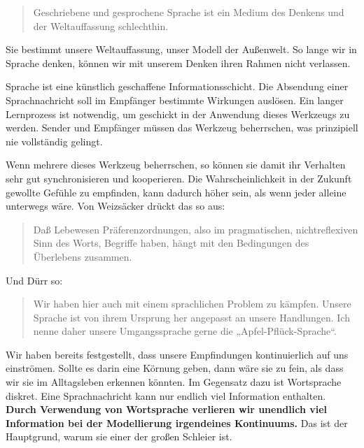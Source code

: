 \documentclass[12pt]{book}
\begin{document}
\begin{quote}\begin{tcolorbox}
Geschriebene und gesprochene Sprache ist ein Medium des Denkens und der Weltauffassung schlechthin.
\end{tcolorbox}\end{quote}

Sie bestimmt unsere Weltauffassung, unser Modell der Außenwelt. So lange wir in Sprache denken, können wir mit unserem Denken ihren Rahmen nicht verlassen. 

Sprache ist eine künstlich geschaffene Informationsschicht. Die Absendung einer Sprachnachricht soll im Empfänger bestimmte Wirkungen auslösen. Ein langer Lernprozess ist notwendig, um geschickt in der Anwendung dieses Werkzeugs zu werden. Sender und Empfänger müssen das Werkzeug beherrschen, was prinzipiell nie vollständig gelingt.

Wenn mehrere dieses Werkzeug beherrschen, so können sie damit ihr Verhalten sehr gut synchronisieren und kooperieren. Die Wahrscheinlichkeit in der Zukunft gewollte Gefühle zu empfinden, kann dadurch höher sein, als wenn jeder alleine unterwegs wäre. Von Weizsäcker drückt das so aus:

\begin{quote}\begin{tcolorbox}
Daß Lebewesen Präferenzordnungen, also im pragmatischen, nichtreflexiven Sinn des Worts, Begriffe haben, hängt mit den Bedingungen des Überlebens zusammen.
\end{tcolorbox}\end{quote}

Und Dürr so:
\begin{quote}\begin{tcolorbox}
Wir haben hier auch mit einem sprachlichen Problem zu kämpfen. Unsere Sprache ist von ihrem Ursprung her angepasst an unsere Handlungen. Ich nenne daher unsere Umgangssprache gerne die „Apfel-Pflück-Sprache“.
\end{tcolorbox}\end{quote}

Wir haben bereits festgestellt, dass unsere Empfindungen kontinuierlich auf uns einströmen. Sollte es darin eine Körnung geben, dann wäre sie zu fein, als dass wir sie im Alltagsleben erkennen könnten. Im Gegensatz dazu ist Wortsprache diskret. Eine Sprachnachricht kann nur endlich viel Information enthalten. \textbf{Durch Verwendung von Wortsprache verlieren wir unendlich viel Information bei der Modellierung irgendeines Kontinuums.} Das ist der Hauptgrund, warum sie einer der großen Schleier ist.
\end{document}
